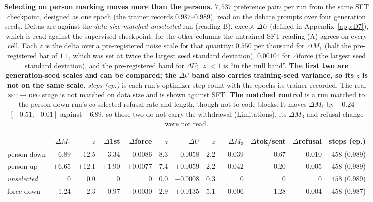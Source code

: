 \begin{table}[t]\centering\scriptsize\setlength{\tabcolsep}{3pt}
\caption{\textbf{Selecting on person marking moves more than the persons.} $7{,}537$ preference pairs
per run from the same SFT
checkpoint, designed as one epoch (the trainer records $0.987$--$0.989$), read on the debate prompts over four generation seeds. Deltas are
against the \emph{data-size-matched unselected} run (reading B), except $\Delta U$ (defined in Appendix~\ref{app:D7}), which is read against the supervised checkpoint; for the other columns the untrained-SFT
reading (A) agrees on every cell. Each $z$ is the delta over a pre-registered
noise scale for that quantity: $0.550$ per thousand for $\Delta M_1$
(half the pre-registered bar of $1.1$, which was set at twice the largest seed
standard deviation), $0.00104$ for $\Delta$force (the largest seed standard deviation), and the pre-registered band for
$\Delta U$; $|z|<1$ is ``in the null band''. \textbf{The first two are generation-seed scales and can be compared; the $\Delta U$ band also carries training-seed variance, so its $z$ is not on the same scale.} \emph{steps (ep.)} is each run's optimizer step count with the epochs its trainer recorded. The real \textsc{sft}$\rightarrow$\textsc{dpo} stage is not
matched on data size and is shown against SFT. \textbf{The matched control} is a run matched to the person-down run's co-selected refusal rate and length, though not to code blocks. It moves $\Delta M_1$ by $-0.24$ $[-0.51,-0.01]$ against $-6.89$, so those two do not carry the withdrawal (Limitations). Its $\Delta M_3$ and refusal change were not read.}
\label{tab:dial_dial}
\begin{tabular}{lrrrrrrrrrrr}
\toprule
 & $\Delta M_1$ & $z$ & $\Delta$1st & $\Delta$force & $z$ & $\Delta U$ & $z$ & $\Delta M_3$ & $\Delta$tok/sent & $\Delta$refusal & steps (ep.) \\
\midrule
person-down    & $-6.89$ & $-12.5$ & $-3.34$ & $-0.0086$ & $8.3$ & $-0.0058$ & $2.2$ & $+0.039$ & $+0.67$ & $-0.010$ & $458$ ($0.989$) \\
person-up      & $+6.65$ & $+12.1$ & $+1.90$ & $+0.0077$ & $7.4$ & $+0.0059$ & $2.2$ & $-0.042$ & $-0.20$ & $+0.005$ & $458$ ($0.989$) \\
\textit{unselected} & $0$ & $0.0$ & $0$ & $0$ & $0.0$ & $-0.0008$ & $0.3$ & $0$ & $0$ & $0$ & $458$ ($0.989$) \\
force-down     & $-1.24$ & $-2.3$ & $-0.97$ & $-0.0030$ & $2.9$ & $+0.0135$ & $5.1$ & $+0.006$ & $+1.28$ & $-0.004$ & $458$ ($0.987$) \\

\end{tabular}
\end{table}
